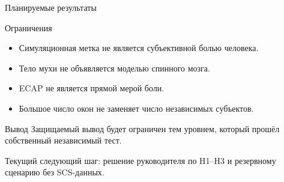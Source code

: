 \begin{frame}{Планируемые результаты}
\end{frame}
\begin{frame}{Ограничения}
\begin{itemize}
  \item Симуляционная метка не является субъективной болью человека.
  \item Тело мухи не объявляется моделью спинного мозга.
  \item ECAP не является прямой мерой боли.
  \item Большое число окон не заменяет число независимых субъектов.
\end{itemize}
\end{frame}
\begin{frame}{Вывод}
\Large Защищаемый вывод будет ограничен тем уровнем, который прошёл собственный независимый тест.
\vspace{0.5cm}

\small Текущий следующий шаг: решение руководителя по H1--H3 и резервному сценарию без SCS-данных.
\end{frame}
